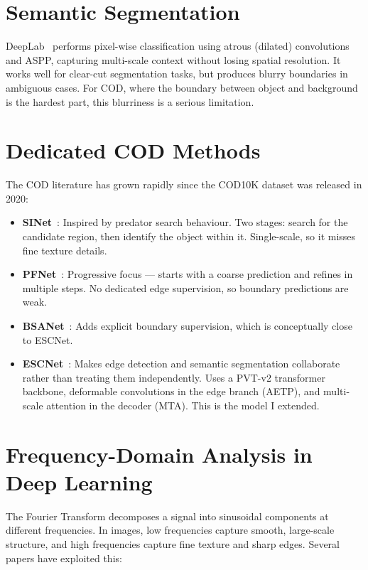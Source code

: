 \documentclass[12pt,a4paper]{report}
\begin{document}
\section{Semantic Segmentation}

DeepLab~\cite{chen2018deeplab} performs pixel-wise classification using atrous (dilated) convolutions and ASPP, capturing multi-scale context without losing spatial resolution. It works well for clear-cut segmentation tasks, but produces blurry boundaries in ambiguous cases. For COD, where the boundary between object and background is the hardest part, this blurriness is a serious limitation.

\section{Dedicated COD Methods}

The COD literature has grown rapidly since the COD10K dataset was released in 2020:

\begin{itemize}
  \item \textbf{SINet}~\cite{fan2020sinet}: Inspired by predator search behaviour. Two stages: search for the candidate region, then identify the object within it. Single-scale, so it misses fine texture details.
  \item \textbf{PFNet}~\cite{mei2021pfnet}: Progressive focus — starts with a coarse prediction and refines in multiple steps. No dedicated edge supervision, so boundary predictions are weak.
  \item \textbf{BSANet}~\cite{zhu2022bsanet}: Adds explicit boundary supervision, which is conceptually close to ESCNet.
  \item \textbf{ESCNet}~\cite{ye2025escnet}: Makes edge detection and semantic segmentation collaborate rather than treating them independently. Uses a PVT-v2 transformer backbone, deformable convolutions in the edge branch (AETP), and multi-scale attention in the decoder (MTA). This is the model I extended.
\end{itemize}

\section{Frequency-Domain Analysis in Deep Learning}

The Fourier Transform decomposes a signal into sinusoidal components at different frequencies. In images, low frequencies capture smooth, large-scale structure, and high frequencies capture fine texture and sharp edges. Several papers have exploited this:
\end{document}
